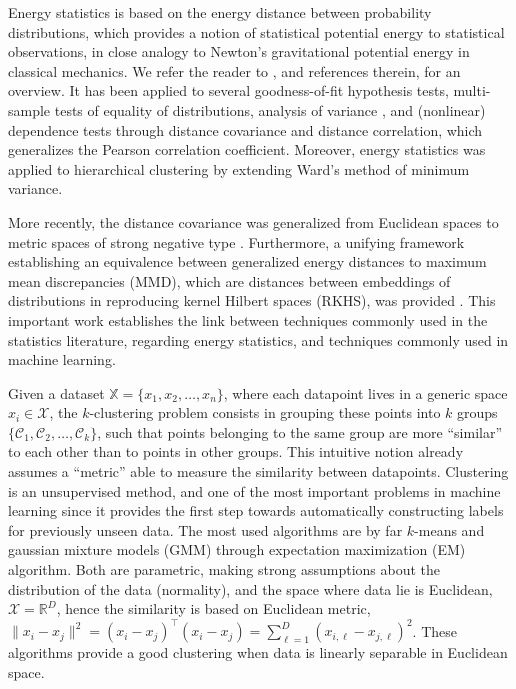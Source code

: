 \documentclass[aps,preprint,nofootinbib,floatfix]{revtex4-1}
\newcommand\C{{\mathcal{C}}}
\begin{document}
Energy statistics is based on the energy distance between probability
distributions, which provides a notion of statistical potential energy
to statistical observations, in close analogy to Newton's gravitational
potential energy in classical mechanics. We refer the reader to
\cite{Szkely2013}, and references therein, for an overview.
It has been applied to several goodness-of-fit hypothesis tests, 
multi-sample tests of equality of distributions, analysis of variance
\cite{RizzoVariance}, and (nonlinear)
dependence tests through
distance covariance and distance correlation, which generalizes the Pearson
correlation coefficient. 
Moreover, energy statistics  was applied
to hierarchical clustering \cite{RizzoClustering} by extending Ward's
method of minimum variance.

More recently, the distance covariance was 
generalized from Euclidean
spaces to metric spaces of strong negative type \cite{Lyons}.
Furthermore, a unifying framework establishing an equivalence
between generalized energy distances to maximum
mean discrepancies (MMD), which are distances between embeddings of
distributions in reproducing kernel Hilbert spaces (RKHS), was
provided \cite{Sejdinovic2013}. This important work establishes the link
between techniques commonly used in the statistics literature, regarding
energy statistics, and techniques
commonly used in machine learning.

Given a dataset $\mathbb{X} = \{x_1, x_2,\dotsc,x_n \}$, where each
datapoint lives in a generic space $x_i \in \mathcal{X}$, the $k$-clustering
problem consists in grouping these points into $k$ groups $\{
\C_1,\C_2,\dotsc,\C_k \}$, such that
points belonging to the same group are more ``similar'' to each other
than to points in  other groups. This intuitive notion already assumes
a ``metric'' able to measure the similarity between datapoints. Clustering
is an unsupervised method, and one of the most important problems in machine
learning since it provides the first step towards automatically constructing
labels for previously unseen data. The most used algorithms are
by far $k$-means and gaussian mixture models (GMM) through expectation
maximization (EM) algorithm. Both are parametric, making 
strong assumptions about
the distribution of the data (normality), and the 
space where data lie is Euclidean, $\mathcal{X} = \mathbb{R}^D$, hence
the similarity is based on Euclidean metric, 
$\| x_i - x_j \|^2 = (x_i - x_j)^\top(x_i-x_j) = 
\sum_{\ell=1}^D (x_{i,\ell} - x_{j,\ell})^2$. These algorithms provide
a good clustering when data is linearly separable in Euclidean space.
\end{document}
